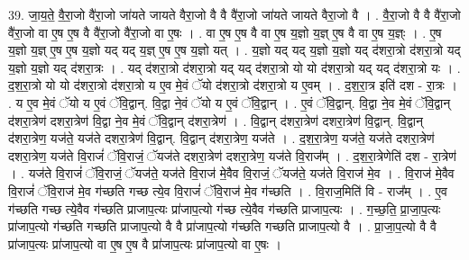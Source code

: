 \documentclass[17pt]{extarticle}
\begin{document}
39. जा॒य॒ते॒ वै॒रा॒जो वै॑रा॒जो जा॑यते जायते वैरा॒जो वै वै वै॑रा॒जो जा॑यते जायते वैरा॒जो वै । . वै॒रा॒जो वै वै वै॑रा॒जो वै॑रा॒जो वा ए॒ष ए॒ष वै वै॑रा॒जो वै॑रा॒जो वा ए॒षः । . वा ए॒ष ए॒ष वै वा ए॒ष य॒ज्ञो य॒ज्ञ् ए॒ष वै वा ए॒ष य॒ज्ञ्ः । . ए॒ष य॒ज्ञो य॒ज्ञ् ए॒ष ए॒ष य॒ज्ञो यद् यद् य॒ज्ञ् ए॒ष ए॒ष य॒ज्ञो यत् । . य॒ज्ञो यद् यद् य॒ज्ञो य॒ज्ञो यद् द॑शरा॒त्रो द॑शरा॒त्रो यद् य॒ज्ञो य॒ज्ञो यद् द॑शरा॒त्रः । . यद् द॑शरा॒त्रो द॑शरा॒त्रो यद् यद् द॑शरा॒त्रो यो यो द॑शरा॒त्रो यद् यद् द॑शरा॒त्रो यः । . द॒श॒रा॒त्रो यो यो द॑शरा॒त्रो द॑शरा॒त्रो य ए॒व मे॒वं ॅयो द॑शरा॒त्रो द॑शरा॒त्रो य ए॒वम् । . द॒श॒रा॒त्र इति॑ दश - रा॒त्रः । . य ए॒व मे॒वं ॅयो य ए॒वं ॅवि॒द्वान्. वि॒द्वा ने॒वं ॅयो य ए॒वं ॅवि॒द्वान् । . ए॒वं ॅवि॒द्वान्. वि॒द्वा ने॒व मे॒वं ॅवि॒द्वान् द॑शरा॒त्रेण॑ दशरा॒त्रेण॑ वि॒द्वा ने॒व मे॒वं ॅवि॒द्वान् द॑शरा॒त्रेण॑ । . वि॒द्वान् द॑शरा॒त्रेण॑ दशरा॒त्रेण॑ वि॒द्वान्. वि॒द्वान् द॑शरा॒त्रेण॒ यज॑ते॒ यज॑ते दशरा॒त्रेण॑ वि॒द्वान्. वि॒द्वान् द॑शरा॒त्रेण॒ यज॑ते । . द॒श॒रा॒त्रेण॒ यज॑ते॒ यज॑ते दशरा॒त्रेण॑ दशरा॒त्रेण॒ यज॑ते वि॒राजं॑ ॅवि॒राजं॒ ॅयज॑ते दशरा॒त्रेण॑ दशरा॒त्रेण॒ यज॑ते वि॒राज᳚म् । . द॒श॒रा॒त्रेणेति॑ दश - रा॒त्रेण॑ । . यज॑ते वि॒राजं॑ ॅवि॒राजं॒ ॅयज॑ते॒ यज॑ते वि॒राज॑ मे॒वैव वि॒राजं॒ ॅयज॑ते॒ यज॑ते वि॒राज॑ मे॒व । . वि॒राज॑ मे॒वैव वि॒राजं॑ ॅवि॒राज॑ मे॒व ग॑च्छति गच्छ त्ये॒व वि॒राजं॑ ॅवि॒राज॑ मे॒व ग॑च्छति । . वि॒राज॒मिति॑ वि - राज᳚म् । . ए॒व ग॑च्छति गच्छ त्ये॒वैव ग॑च्छति प्राजाप॒त्यः प्रा॑जाप॒त्यो ग॑च्छ त्ये॒वैव ग॑च्छति प्राजाप॒त्यः । . ग॒च्छ॒ति॒ प्रा॒जा॒प॒त्यः प्रा॑जाप॒त्यो ग॑च्छति गच्छति प्राजाप॒त्यो वै वै प्रा॑जाप॒त्यो ग॑च्छति गच्छति प्राजाप॒त्यो वै । . प्रा॒जा॒प॒त्यो वै वै प्रा॑जाप॒त्यः प्रा॑जाप॒त्यो वा ए॒ष ए॒ष वै प्रा॑जाप॒त्यः प्रा॑जाप॒त्यो वा ए॒षः । \newline
\end{document}
